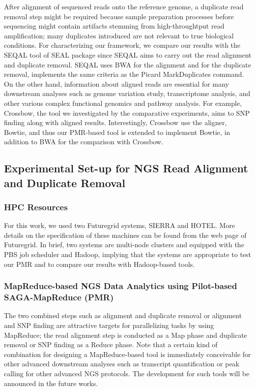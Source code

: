 \documentclass{sig-alternate}
\begin{document}
After alignment of sequenced reads onto the reference genome, a duplicate read removal step might be required because sample preparation processes before sequencing might contain artifacts stemming from high-throughtput read amplification; many duplicates introduced are not relevant to true biological conditions.  For characterizing our framework, we compare our results with the SEQAL tool of SEAL package since SEQAL aims to carry out the read alignment and duplicate removal.  SEQAL uses BWA for the alignment and for the duplicate removal, implements the same criteria as the Picard MarkDuplicates command\cite{seal2011,seal_2011_mapred}.  On the other hand, information about aligned reads are essential for many downstream analyses such as genome variation study, transcriptome analysis, and other various complex functional genomics and pathway analysis.  For example, Crossbow, the tool we investigated by the comparative experiments, aims to SNP finding along with aligned results\cite{langmead2009}.  Interestingly, Crossbow use the aligner, Bowtie, and thus our PMR-based tool is extended to implement Bowtie, in addition to BWA for the comparison with Crossbow.

\subsection{Experimental Set-up for NGS Read Alignment and Duplicate Removal}
\subsubsection{HPC Resources}
For this work, we used two Futuregrid systems, SIERRA and HOTEL.  More details on the specification of these machines can be found from the web page of Futuregrid\cite{futuregrid_url}.  In brief, two systems are multi-node clusters and equipped with the PBS job scheduler and Hadoop, implying that the systems are appropriate to test our PMR and to compare our results with Hadoop-based tools.

\subsubsection{MapReduce-based NGS Data Analytics using Pilot-based SAGA-MapReduce (PMR)}
The two combined steps such as alignment and duplicate removal or alignment and SNP finding are attractive targets for  parallelizing tasks by using MapReduce; the read alignment step is conducted as a Map phase and duplicate removal or SNP finding as a Reduce phase.  Note that a certain kind of combination for designing a MapReduce-based tool is immediately conceivable for other advanced downstream analyses such as transcript quantification or peak calling for other advanced NGS protocols.  The development for such tools will be announced in the future works.
\end{document}
